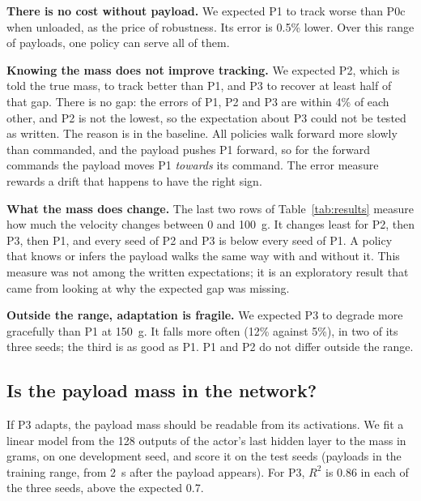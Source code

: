 \documentclass[conference]{IEEEtran}
\begin{document}
\textbf{There is no cost without payload.} We expected P1 to track worse than P0c when unloaded, as the price of robustness. Its error is 0.5\% lower. Over this range of payloads, one policy can serve all of them.

\textbf{Knowing the mass does not improve tracking.} We expected P2, which is told the true mass, to track better than P1, and P3 to recover at least half of that gap. There is no gap: the errors of P1, P2 and P3 are within 4\% of each other, and P2 is not the lowest, so the expectation about P3 could not be tested as written.
The reason is in the baseline. All policies walk forward more slowly than commanded, and the payload pushes P1 forward, so for the forward commands the payload moves P1 \emph{towards} its command. The error measure rewards a drift that happens to have the right sign.

\textbf{What the mass does change.} The last two rows of Table~\ref{tab:results} measure how much the velocity changes between 0 and \SI{100}{g}. It changes least for P2, then P3, then P1, and every seed of P2 and P3 is below every seed of P1. A policy that knows or infers the payload walks the same way with and without it. This measure was not among the written expectations; it is an exploratory result that came from looking at why the expected gap was missing.

\textbf{Outside the range, adaptation is fragile.} We expected P3 to degrade more gracefully than P1 at \SI{150}{g}. It falls more often (12\% against 5\%), in two of its three seeds; the third is as good as P1. P1 and P2 do not differ outside the range.

\begin{table}[t]
\centering
\caption{Part II, test seeds, 768 episodes per mass and policy. Velocity change: mean forward velocity at \SI{100}{g} minus at \SI{0}{g}.}
\label{tab:results}
\footnotesize
\setlength{\tabcolsep}{4pt}

\end{table}

\subsection{Is the payload mass in the network?}
\label{sec:probe}

If P3 adapts, the payload mass should be readable from its activations. We fit a linear model from the 128 outputs of the actor's last hidden layer to the mass in grams, on one development seed, and score it on the test seeds (payloads in the training range, from \SI{2}{s} after the payload appears).
For P3, $R^2$ is 0.86 in each of the three seeds, above the expected 0.7.
\end{document}
